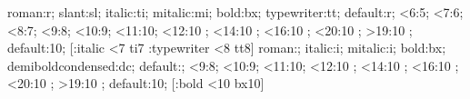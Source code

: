 %
%
%
%
%
%
%
    {roman:r; slant:sl; italic:ti; mitalic:mi; bold:bx; typewriter:tt;
     default:r;}%
    {<6:5; <7:6; <8:7; <9:8; <10:9; <11:10; <12:10 \sc@led\magstephalf;
     <14:10 \sc@led{}; <16:10 \sc@led{};
     <20:10 \sc@led{}; >19:10 \sc@led{};
     default:10;}%
    [\ifStyle:italic \ifnum\Fsize<7 ti7\fi\fi
     \ifStyle:typewriter \ifnum\Fsize<8 tt8\fi\fi]
%
    {roman:; italic:i; mitalic:i; bold:bx; demiboldcondensed:dc;
     default:;}%
    {<9:8; <10:9; <11:10; <12:10 \sc@led\magstephalf;
     <14:10 \sc@led{}; <16:10 \sc@led{};
     <20:10 \sc@led{}; >19:10 \sc@led{};
     default:10;}%
    [\ifStyle:bold \ifnum\Fsize<10 bx10\fi\fi]


\endinput

